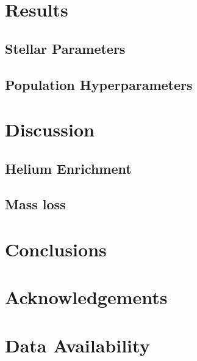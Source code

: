 \documentclass[fleqn,usenatbib]{mnras}
\begin{document}
\section{Results}

\subsection{Stellar Parameters}

\subsection{Population Hyperparameters}

\section{Discussion}



\subsection{Helium Enrichment}

\subsection{Mass loss}

\section{Conclusions}



\section*{Acknowledgements}


\section*{Data Availability}









\end{document}
